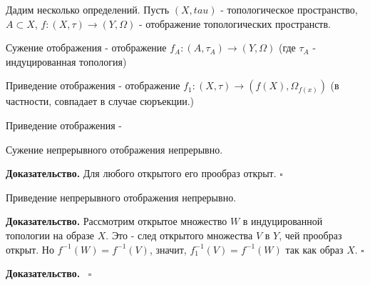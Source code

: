 Дадим несколько определений. Пусть $(X,tau)$ - топологическое пространство,
 $A\subset X$, $f\colon (X,\tau)\to(Y,\Omega)$ - отображение 
 топологических пространств.
\begin{defin}
Сужение отображения - отображение $f_A\colon(A,\tau_A)\to (Y,\Omega)$ (где
$\tau_A$ - индуцированная топология)
\end{defin}
\begin{defin}
    Приведение отображения - отображение $f_1\colon(X,\tau)\to(f(X),
    \Omega_{f(x)})$ (в частности, совпадает в случае сюръекции.)
\end{defin}
\begin{defin}
Приведение отображения -  
\end{defin}
\begin{theor}
Сужение непрерывного отображения непрерывно. 
\end{theor}
\textbf{Доказательство.} Для любого открытого его прообраз открыт.
$\square$ 
\begin{theor}
Приведение непрерывного отображения непрерывно.     
\end{theor}
\textbf{Доказательство.} Рассмотрим открытое множество $W$ в индуцированной 
топологии на образе $X$. Это - след открытого множества $V$ в $Y$, чей 
прообраз открыт. Но $f^{-1}(W)=f^{-1}(V)$, значит, $f_{1}^{-1}(V)=f^{-1}(W)$ 
так как образ $X$. 
$\square$ 
\begin{theor}

\end{theor}
\textbf{Доказательство.}  \
$\square$ 




